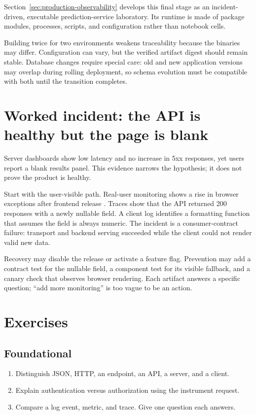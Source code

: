 Section~\ref{sec:production-observability} develops this final stage as an
incident-driven, executable prediction-service laboratory. Its runtime is made
of package modules, processes, scripts, and configuration rather than notebook
cells.

Building twice for two environments weakens traceability because the binaries
may differ. Configuration can vary, but the verified artifact digest should
remain stable. Database changes require special care: old and new application
versions may overlap during rolling deployment, so schema evolution must be
compatible with both until the transition completes.

\section{Worked incident: the API is healthy but the page is blank}

Server dashboards show low latency and no increase in 5xx responses, yet users
report a blank results panel. This evidence narrows the hypothesis; it does not
prove the product is healthy.

Start with the user-visible path. Real-user monitoring shows a rise in browser
exceptions after frontend release . Traces show that the API
returned 200 responses with a newly nullable field. A client log identifies a
formatting function that assumes the field is always numeric. The incident is a
consumer-contract failure: transport and backend serving succeeded while the
client could not render valid new data.

Recovery may disable the release or activate a feature flag. Prevention may
add a contract test for the nullable field, a component test for its visible
fallback, and a canary check that observes browser rendering. Each artifact
answers a specific question; ``add more monitoring'' is too vague to be an
action.


\section{Exercises}

\subsection*{Foundational}
\begin{enumerate}
  \item Distinguish JSON, HTTP, an endpoint, an API, a server, and a client.
  \item Explain authentication versus authorization using the instrument
  request.
  \item Compare a log event, metric, and trace. Give one question each answers.
\end{enumerate}

